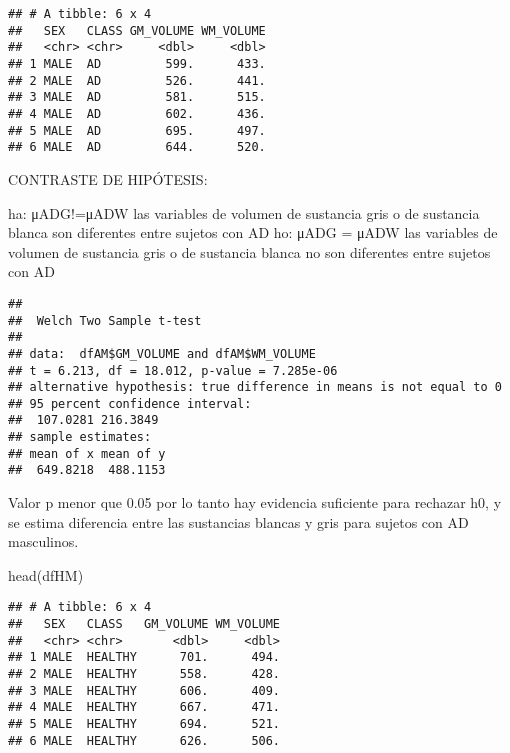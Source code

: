 \documentclass[
]{article}
\newenvironment{Shaded}{\begin{snugshade}}{\end{snugshade}}
\newcommand{\AttributeTok}[1]{\textcolor[rgb]{0.77,0.63,0.00}{#1}}
\newcommand{\FunctionTok}[1]{\textcolor[rgb]{0.00,0.00,0.00}{#1}}
\newcommand{\NormalTok}[1]{#1}
\newcommand{\SpecialCharTok}[1]{\textcolor[rgb]{0.00,0.00,0.00}{#1}}
\newcommand{\StringTok}[1]{\textcolor[rgb]{0.31,0.60,0.02}{#1}}
\begin{document}
\begin{verbatim}
## # A tibble: 6 x 4
##   SEX   CLASS GM_VOLUME WM_VOLUME
##   <chr> <chr>     <dbl>     <dbl>
## 1 MALE  AD         599.      433.
## 2 MALE  AD         526.      441.
## 3 MALE  AD         581.      515.
## 4 MALE  AD         602.      436.
## 5 MALE  AD         695.      497.
## 6 MALE  AD         644.      520.
\end{verbatim}

CONTRASTE DE HIPÓTESIS:

ha: μADG!=μADW las variables de volumen de sustancia gris o de sustancia
blanca son diferentes entre sujetos con AD ho: μADG = μADW las variables
de volumen de sustancia gris o de sustancia blanca no son diferentes
entre sujetos con AD

\begin{Shaded}
\end{Shaded}

\begin{verbatim}
## 
##  Welch Two Sample t-test
## 
## data:  dfAM$GM_VOLUME and dfAM$WM_VOLUME
## t = 6.213, df = 18.012, p-value = 7.285e-06
## alternative hypothesis: true difference in means is not equal to 0
## 95 percent confidence interval:
##  107.0281 216.3849
## sample estimates:
## mean of x mean of y 
##  649.8218  488.1153
\end{verbatim}

Valor p menor que 0.05 por lo tanto hay evidencia suficiente para
rechazar h0, y se estima diferencia entre las sustancias blancas y gris
para sujetos con AD masculinos.

\begin{Shaded}
\begin{Highlighting}[]
\FunctionTok{head}\NormalTok{(dfHM)}
\end{Highlighting}
\end{Shaded}

\begin{verbatim}
## # A tibble: 6 x 4
##   SEX   CLASS   GM_VOLUME WM_VOLUME
##   <chr> <chr>       <dbl>     <dbl>
## 1 MALE  HEALTHY      701.      494.
## 2 MALE  HEALTHY      558.      428.
## 3 MALE  HEALTHY      606.      409.
## 4 MALE  HEALTHY      667.      471.
## 5 MALE  HEALTHY      694.      521.
## 6 MALE  HEALTHY      626.      506.
\end{verbatim}
\end{document}
